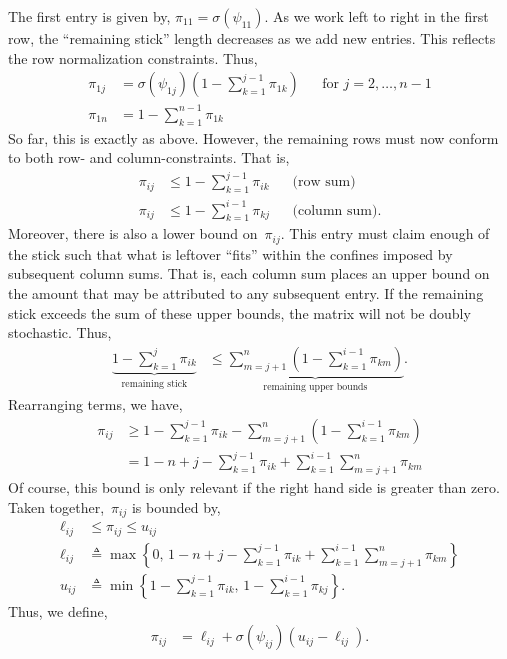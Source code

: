 The first entry is given by, ${\pi}_{11} = \sigma(\psi_{11})$.
As we work left to right in the first row, the ``remaining stick'' length
decreases as we add new entries. This reflects the row normalization constraints.
Thus,
\begin{align}
  {\pi}_{1j} &= \sigma(\psi_{1j}) (1 - \sum_{k=1}^{j-1} {\pi}_{1k})  & &  \text{for } j=2, \ldots, n-1\\
  {\pi}_{1n} &= 1 - \sum_{k=1}^{n-1} {\pi}_{1k}
\end{align}
So far, this is exactly as above. However, the remaining rows must now
conform to both row- and column-constraints. That is,
\begin{align}
{\pi}_{ij} &\leq 1- \sum_{k=1}^{j-1} {\pi}_{ik} & & \text{(row sum)} \\
{\pi}_{ij} &\leq 1- \sum_{k=1}^{i-1} {\pi}_{kj} & & \text{(column sum)}.
\end{align}
Moreover, there is also a lower bound on~${\pi}_{ij}$. This entry must
claim enough of the stick such that what is leftover ``fits'' within the confines
imposed by subsequent column sums. That is, each column sum places an upper
bound on the amount that may be attributed to any subsequent entry. If the remaining
stick exceeds the sum of these upper bounds, the matrix will not be doubly stochastic.
Thus,
\begin{align}
\underbrace{1 - \sum_{k=1}^j \pi_{ik}}_{\text{remaining stick}}
&\leq \underbrace{\sum_{m=j+1}^n (1- \sum_{k=1}^{i-1} {\pi}_{km})}_{\text{remaining upper bounds}}.
\end{align}
Rearranging terms, we have,
\begin{align}
\pi_{ij} &\geq 1- \sum_{k=1}^{j-1} \pi_{ik} - \sum_{m=j+1}^n (1- \sum_{k=1}^{i-1} {\pi}_{km}) \\
&= 1 - n + j - \sum_{k=1}^{j-1} \pi_{ik}  +  \sum_{k=1}^{i-1} \sum_{m=j+1}^n {\pi}_{km}
\end{align}
Of course, this bound is only relevant if the right hand side is greater than zero.
Taken together,~${\pi}_{ij}$ is bounded by,
\begin{align}
\ell_{ij} &\leq
{\pi}_{ij}
\leq
u_{ij}
\\
\ell_{ij} &\triangleq \max \left \{0, \, 1 - n + j - \sum_{k=1}^{j-1} {\pi}_{ik}  +  \sum_{k=1}^{i-1} \sum_{m=j+1}^n {\pi}_{km} \right \}
\\
u_{ij} &\triangleq 
\min \left \{1- \sum_{k=1}^{j-1} {\pi}_{ik}, \,
1- \sum_{k=1}^{i-1} {\pi}_{kj} \right\}.
\end{align}
Thus, we define,
\begin{align}
  {\pi}_{ij} &= \ell_{ij} + \sigma(\psi_{ij}) (u_{ij} - \ell_{ij}).
\end{align}

